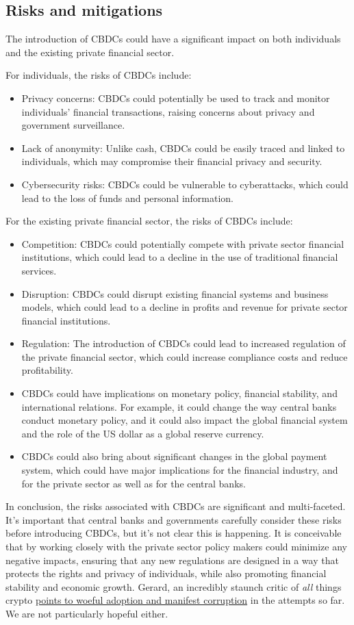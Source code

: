 \subsection{Risks and mitigations}
The introduction of CBDCs could have a significant impact on both individuals and the existing private financial sector.\par
For individuals, the risks of CBDCs include:
\begin{itemize}
\item Privacy concerns: CBDCs could potentially be used to track and monitor individuals' financial transactions, raising concerns about privacy and government surveillance.
\item Lack of anonymity: Unlike cash, CBDCs could be easily traced and linked to individuals, which may compromise their financial privacy and security.
\item Cybersecurity risks: CBDCs could be vulnerable to cyberattacks, which could lead to the loss of funds and personal information.
\end{itemize}
For the existing private financial sector, the risks of CBDCs include:
\begin{itemize}
\item Competition: CBDCs could potentially compete with private sector financial institutions, which could lead to a decline in the use of traditional financial services.
\item Disruption: CBDCs could disrupt existing financial systems and business models, which could lead to a decline in profits and revenue for private sector financial institutions.
\item Regulation: The introduction of CBDCs could lead to increased regulation of the private financial sector, which could increase compliance costs and reduce profitability.
\item CBDCs could have implications on monetary policy, financial stability, and international relations. For example, it could change the way central banks conduct monetary policy, and it could also impact the global financial system and the role of the US dollar as a global reserve currency. 
\item CBDCs could also bring about significant changes in the global payment system, which could have major implications for the financial industry, and for the private sector as well as for the central banks.
\end{itemize} 
In conclusion, the risks associated with CBDCs are significant and multi-faceted. It's important that central banks and governments carefully consider these risks before introducing CBDCs, but it's not clear this is happening. It is conceivable that by working closely with the private sector policy makers could minimize any negative impacts, ensuring that any new regulations are designed in a way that protects the rights and privacy of individuals, while also promoting financial stability and economic growth. Gerard, an incredibly staunch critic of \textit{all} things crypto \href{https://davidgerard.co.uk/blockchain/2023/02/28/news-blockchain-mep-eva-kaili-corruption-arrest-nigerian-cbdc-rewrite-bbc-blockchain-misadventures/}{points to woeful adoption and manifest corruption} in the attempts so far. We are not particularly hopeful either.
